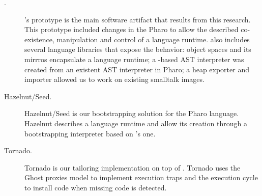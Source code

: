 \begin{description}

\item[\Vtt.] \Vtt's prototype is the main software artifact that results from this research. This prototype included changes in the Pharo \VM to allow the described co-existence, manipulation and control of a language runtime. \Vtt also includes several language libraries that expose the \VM behavior: object spaces and its mirrros encapsulate a language runtime; a \Vtt-based AST interpreter was created from an existent AST interpreter in Pharo; a heap exporter and importer allowed us to work on existing smalltalk images.

\item[Hazelnut/Seed.] Hazelnut/Seed is our bootstrapping solution for the Pharo language. Hazelnut describes a language runtime and allow its creation through a bootstrapping interpreter based on \Vtt's one.

\item[Tornado.] Tornado is our tailoring implementation on top of \Vtt. Tornado uses the Ghost proxies model to implement execution traps and the \Vtt execution cycle to install code when missing code is detected.

\end{description}

